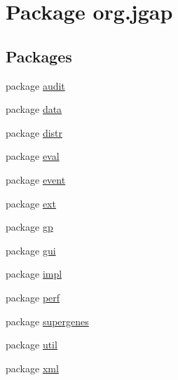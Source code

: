 \hypertarget{namespaceorg_1_1jgap}{\section{Package org.\-jgap}
\label{namespaceorg_1_1jgap}
}
\subsection*{Packages}
\begin{DoxyCompactItemize}
\item 
package \hyperlink{namespaceorg_1_1jgap_1_1audit}{audit}
\item 
package \hyperlink{namespaceorg_1_1jgap_1_1data}{data}
\item 
package \hyperlink{namespaceorg_1_1jgap_1_1distr}{distr}
\item 
package \hyperlink{namespaceorg_1_1jgap_1_1eval}{eval}
\item 
package \hyperlink{namespaceorg_1_1jgap_1_1event}{event}
\item 
package \hyperlink{namespaceorg_1_1jgap_1_1ext}{ext}
\item 
package \hyperlink{namespaceorg_1_1jgap_1_1gp}{gp}
\item 
package \hyperlink{namespaceorg_1_1jgap_1_1gui}{gui}
\item 
package \hyperlink{namespaceorg_1_1jgap_1_1impl}{impl}
\item 
package \hyperlink{namespaceorg_1_1jgap_1_1perf}{perf}
\item 
package \hyperlink{namespaceorg_1_1jgap_1_1supergenes}{supergenes}
\item 
package \hyperlink{namespaceorg_1_1jgap_1_1util}{util}
\item 
package \hyperlink{namespaceorg_1_1jgap_1_1xml}{xml}
\end{DoxyCompactItemize}
